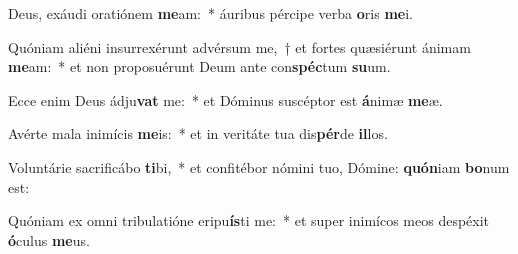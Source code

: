 \item Deus, exáudi oratiónem \textbf{me}am:~* áuribus pércipe verba \textbf{o}ris \textbf{me}i.
\item Quóniam aliéni insurrexérunt advérsum me,~† et fortes quæsiérunt ánimam \textbf{me}am:~* et non proposuérunt Deum ante con\textbf{spéc}tum \textbf{su}um.
\item Ecce enim Deus ádju\textbf{vat} me:~* et Dóminus suscéptor est \textbf{á}nimæ \textbf{me}æ.
\item Avérte mala inimícis \textbf{me}is:~* et in veritáte tua dis\textbf{pér}de \textbf{il}los.
\item Voluntárie sacrificábo \textbf{ti}bi,~* et confitébor nómini tuo, Dómine: \textbf{quón}iam \textbf{bo}num est:
\item Quóniam ex omni tribulatióne eripu\textbf{ís}ti me:~* et super inimícos meos despéxit \textbf{ó}culus \textbf{me}us.
